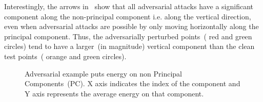 Interestingly, the arrows in~ show that all adversarial
attacks have a significant component along the non-principal component i.e.
along the vertical direction, even when adversarial attacks are possible by only
moving horizontally along the principal component. Thus, the adversarially
perturbed points~({\color{red} red} and {\color{green} green} circles) tend to
have a larger~(in magnitude) vertical component than the clean test
points~({\color{orange} orange} and {\color{green} green} circles). 

\begin{figure}[t]
  \centering
  \begin{subfigure}[t]{0.16\linewidth}
    \def\svgwidth{0.99\columnwidth}
    
    \label{fig:1-prin-comp}
  \end{subfigure}
  \begin{subfigure}[t]{0.16\linewidth}
    \def\svgwidth{0.99\columnwidth}
    
    \label{fig:2-prin-comp}
  \end{subfigure}
  \begin{subfigure}[t]{0.16\linewidth}
    \def\svgwidth{0.99\columnwidth}
    
    \label{fig:3-prin-comp}
  \end{subfigure}
  \begin{subfigure}[t]{0.16\linewidth}
    \def\svgwidth{0.99\columnwidth}
    
    \label{fig:4-prin-comp}
  \end{subfigure}
  \begin{subfigure}[t]{0.16\linewidth}
    \def\svgwidth{0.99\columnwidth}
    
    \label{fig:5-prin-comp}
  \end{subfigure}
  \begin{subfigure}[t]{0.16\linewidth}
    \def\svgwidth{0.99\columnwidth}
    
    \label{fig:6-prin-comp}
  \end{subfigure}
  \caption{Adversarial example puts energy on non Principal Components~(PC). X axis indicates the index of the component and Y axis represents the average energy on that component.}
  \label{fig:energy-principal-comp}
\end{figure}

